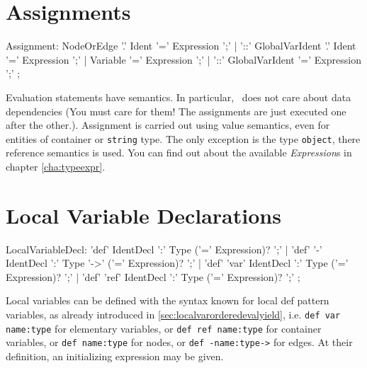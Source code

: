 \section{Assignments} \label{sub:assignments}

\begin{rail}
  Assignment:
	  NodeOrEdge '.' Ident '=' Expression ';' |
	  '::' GlobalVarIdent '.' Ident '=' Expression ';' |
	  Variable '=' Expression ';' |
	  '::' GlobalVarIdent '=' Expression ';'
	;
\end{rail}

Evaluation statements have  semantics.
In particular, \GrG\ does not care about data dependencies (You must care for them! The assignments are just executed one after the other.).
Assignment is carried out using value semantics, even for entities of container or \texttt{string} type.
The only exception is the type \texttt{object}, there reference semantics is used.
You can find out about the available \emph{Expression}s in chapter \ref{cha:typeexpr}.


\section{Local Variable Declarations} 

\begin{rail} 
  LocalVariableDecl: 
	'def' IdentDecl ':' Type ('=' Expression)? ';' |
	'def' '-' IdentDecl ':' Type '->' ('=' Expression)? ';' |
	'def' 'var' IdentDecl ':' Type ('=' Expression)? ';' |
	'def' 'ref' IdentDecl ':' Type ('=' Expression)? ';'
	;
\end{rail}

Local variables can be defined with the syntax known for local def pattern variables, as already introduced in \ref{sec:localvarorderedevalyield}, i.e. \texttt{def var name:type} for elementary variables, or \texttt{def ref name:type} for container variables, or \texttt{def name:type} for nodes, or \texttt{def -name:type->} for edges.
At their definition, an initializing expression may be given.

